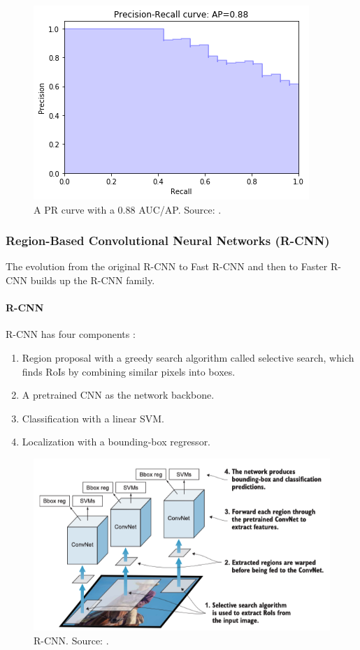 \documentclass[a4paper, 11pt, oneside]{article}
\begin{document}
  \begin{figure}[ht]
    \begin{center}
      \includegraphics[width=.5\textwidth]{pr_curve.png}
    \end{center}
    \caption{A PR curve with a 0.88 AUC/AP. Source: \cite{planche2019hands}.}
  \end{figure}

  \subsubsection{Region-Based Convolutional Neural Networks (R-CNN)}

  The evolution from the original R-CNN \cite{girshick2014rich} to Fast R-CNN \cite{girshick2015fast} and then to
  Faster R-CNN \cite{ren2015faster} builds up the R-CNN family.

  \paragraph{R-CNN}

  R-CNN has four components \cite{elgendy2020deep, girshick2014rich}:

  \begin{enumerate}
    \item Region proposal with a greedy search algorithm called selective search, which finds RoIs by combining similar
    pixels into boxes.
    \item A pretrained CNN as the network backbone.
    \item Classification with a linear SVM.
    \item Localization with a bounding-box regressor.
  \end{enumerate}

  \begin{figure}[ht]
    \begin{center}
      \includegraphics[width=.8\textwidth]{r_cnn.png}
    \end{center}
    \caption{R-CNN. Source: \cite{elgendy2020deep}.}
  \end{figure}
\end{document}
